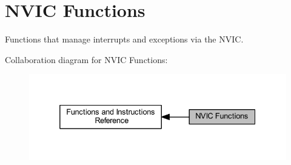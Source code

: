 \hypertarget{group___c_m_s_i_s___core___n_v_i_c_functions}{}\section{N\+V\+IC Functions}
\label{group___c_m_s_i_s___core___n_v_i_c_functions}


Functions that manage interrupts and exceptions via the N\+V\+IC.  


Collaboration diagram for N\+V\+IC Functions\+:
\nopagebreak
\begin{figure}[H]
\begin{center}
\leavevmode
\includegraphics[width=332pt]{group___c_m_s_i_s___core___n_v_i_c_functions}
\end{center}
\end{figure}
